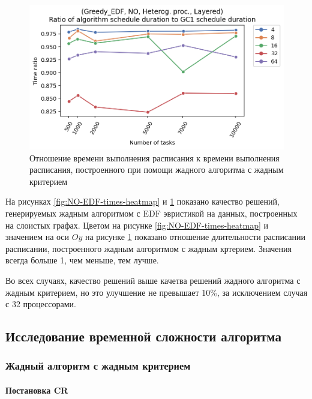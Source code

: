 \begin{figure}[!htbp]
    \centering
    \includegraphics[width=\textwidth]{imgs/unbalanced/NO_EDF/gr_amalgamated.png}
    \caption{Отношение времени выполнения расписания к времени выполнения расписания, построенного при помощи жадного алгоритма с жадным критерием}
    \label{fig:NO-EDF-times-compiled}
\end{figure}

На рисунках \ref{fig:NO-EDF-times-heatmap} и \ref{fig:NO-EDF-times-compiled} показано качество решений, генерируемых жадным алгоритмом с EDF эвристикой на данных, построенных на слоистых графах. Цветом на рисунке \ref{fig:NO-EDF-times-heatmap} и значением на оси $Oy$ на рисунке \ref{fig:NO-EDF-times-compiled} показано отношение длительности расписании расписании, построенного жадным алгоритмом с жадным кртерием. Значения всегда больше 1, чем меньше, тем лучше.

Во всех случаях, качество решений выше качетва решений жадного алгоритма с жадным критерием, но это улучшение не превышает 10\%, за исключением случая с 32 процессорами.

\subsection{Исследование временной сложности алгоритма}

\subsubsection{Жадный алгоритм с жадным критерием}

\paragraph{Постановка CR}

